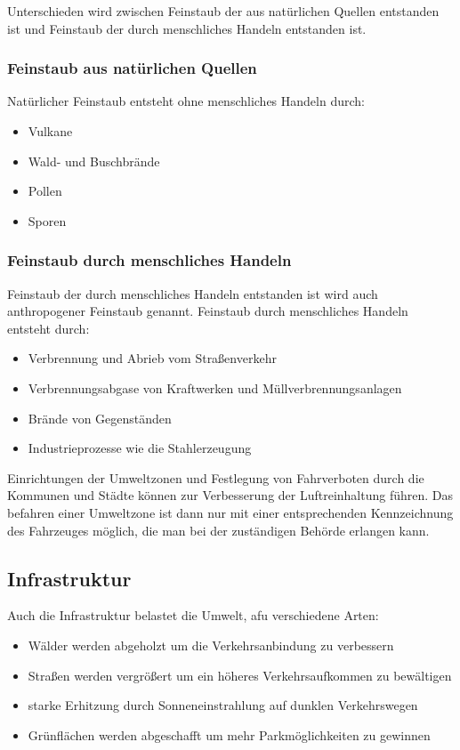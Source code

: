 Unterschieden wird zwischen Feinstaub der aus natürlichen Quellen entstanden ist und Feinstaub der durch menschliches Handeln entstanden ist.

\subsubsection{Feinstaub aus natürlichen Quellen}
Natürlicher Feinstaub entsteht ohne menschliches Handeln durch:
\begin{itemize}
	\item Vulkane
	\item Wald- und Buschbrände
	\item Pollen
	\item Sporen
\end{itemize}


\subsubsection{Feinstaub durch menschliches Handeln}
Feinstaub der durch menschliches Handeln entstanden ist wird auch anthropogener Feinstaub genannt.
Feinstaub durch menschliches Handeln entsteht durch:
\begin{itemize}
	\item Verbrennung und Abrieb vom Straßenverkehr
	\item Verbrennungsabgase von Kraftwerken und Müllverbrennungsanlagen
	\item Brände von Gegenständen
	\item Industrieprozesse wie die Stahlerzeugung
\end{itemize}

Einrichtungen der Umweltzonen und Festlegung von Fahrverboten durch die Kommunen und Städte können zur Verbesserung der Luftreinhaltung führen.
Das befahren einer Umweltzone ist dann nur mit einer entsprechenden Kennzeichnung des Fahrzeuges möglich, die man bei der zuständigen Behörde erlangen kann.



\subsection{Infrastruktur}
Auch die Infrastruktur belastet die Umwelt, afu verschiedene Arten:
\begin{itemize}
	\item Wälder werden abgeholzt um die Verkehrsanbindung zu verbessern
	\item Straßen werden vergrößert um ein höheres Verkehrsaufkommen zu bewältigen
	\item starke Erhitzung durch Sonneneinstrahlung auf dunklen Verkehrswegen
	\item Grünflächen werden abgeschafft um mehr Parkmöglichkeiten zu gewinnen
\end{itemize}
